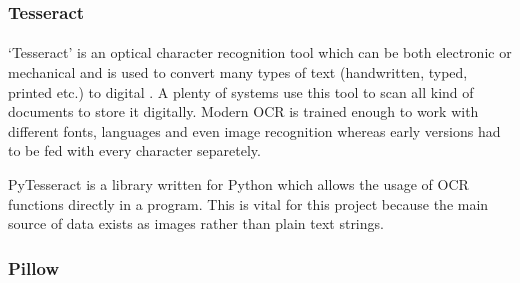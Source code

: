 \documentclass[12pt]{report}
\begin{document}


    \subsubsection{Tesseract}
    \paragraph{}

    `Tesseract' is an optical character recognition tool which can be both electronic or mechanical and is used to convert many types of text (handwritten, typed, printed etc.) to digital \citep{tesseract_article}. A plenty of systems use this tool to scan all kind of documents to store it digitally.
    Modern OCR is trained enough to work with different fonts, languages and even image recognition whereas early versions had to be fed with every character separetely.

    PyTesseract is a library written for Python which allows the usage of OCR functions directly in a program. This is vital for this project because the main source of data exists as images rather than plain text strings.

    \subsubsection{Pillow}
    \paragraph{}
\end{document}
